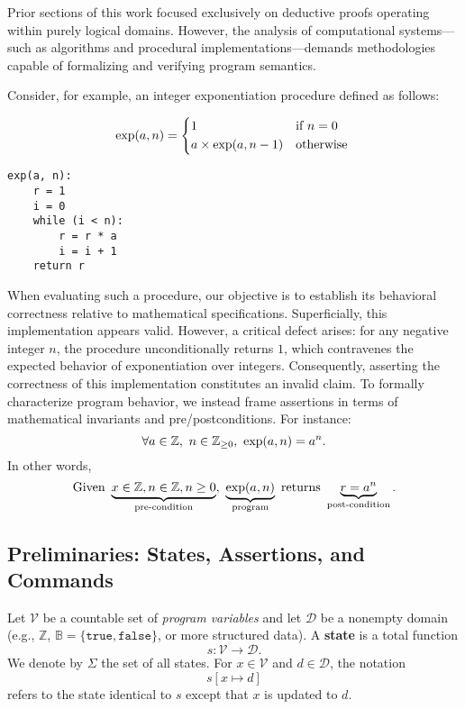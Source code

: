 Prior sections of this work focused exclusively on deductive proofs operating within purely logical domains. However, the analysis of computational systems—such as algorithms and procedural implementations—demands methodologies capable of formalizing and verifying program semantics.

Consider, for example, an integer exponentiation procedure defined as follows:
\begin{center}
\begin{minipage}{.49\textwidth}
\[
\exp(a,n)=\begin{cases*}
1 & if $n=0$ \\
a\times\exp(a,n-1) & otherwise
\end{cases*}
\]
\end{minipage}
\begin{minipage}{.49\textwidth}
\begin{lstlisting}[style=normal, caption={Pseudo code for exponentiation}, captionpos=t]
exp(a, n):
	r = 1
	i = 0
	while (i < n):
		r = r * a
		i = i + 1
	return r
\end{lstlisting}
\end{minipage}
\end{center}
When evaluating such a procedure, our objective is to establish its behavioral correctness relative to mathematical specifications. Superficially, this implementation appears valid. However, a critical defect arises: for any negative integer $n$, the procedure unconditionally returns $1$, which contravenes the expected behavior of exponentiation over integers. Consequently, asserting the correctness of this implementation constitutes an invalid claim. To formally characterize program behavior, we instead frame assertions in terms of mathematical invariants and pre/postconditions. For instance: \[
\forall a\in\mathbb{Z},\ n\in\mathbb{Z}_{\geq 0},\ \exp(a,n)=a^n.
\] In other words, \[
\text{Given}\ \underbrace{x\in\Z,n\in\Z,n\geq 0}_{\text{pre-condition}},\ \underbrace{\exp(a,n)}_{\text{program}}\ \text{returns}\ \underbrace{r=a^n}_{\text{post-condition}}.
\]

\newpage
\subsection{Preliminaries: States, Assertions, and Commands}

Let \(\mathcal{V}\) be a countable set of \textit{program variables} and let \(\mathcal{D}\) be a nonempty domain (e.g., \(\mathbb{Z}\), \(\mathbb{B} = \{\texttt{true},\texttt{false}\}\), or more structured data). A \textbf{state} is a total function \[
s: \mathcal{V} \to \mathcal{D}.
\] We denote by \(\Sigma\) the set of all states. For \(x \in \mathcal{V}\) and \(d \in \mathcal{D}\), the notation \[
s[x \mapsto d]
\] refers to the state identical to \(s\) except that \(x\) is updated to \(d\).


